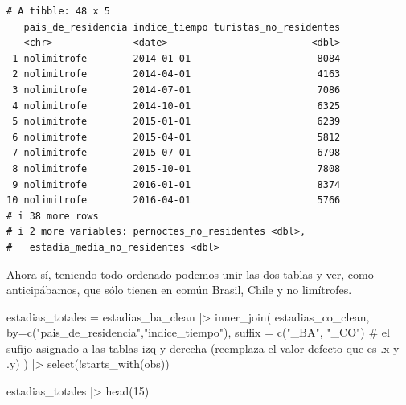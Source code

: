 \documentclass[
  spanish,
  letterpaper,
  DIV=11,
  numbers=noendperiod]{scrartcl}
\newenvironment{Shaded}{\begin{snugshade}}{\end{snugshade}}
\newcommand{\AttributeTok}[1]{\textcolor[rgb]{0.40,0.45,0.13}{#1}}
\newcommand{\CommentTok}[1]{\textcolor[rgb]{0.37,0.37,0.37}{#1}}
\newcommand{\DecValTok}[1]{\textcolor[rgb]{0.68,0.00,0.00}{#1}}
\newcommand{\FunctionTok}[1]{\textcolor[rgb]{0.28,0.35,0.67}{#1}}
\newcommand{\NormalTok}[1]{\textcolor[rgb]{0.00,0.23,0.31}{#1}}
\newcommand{\OtherTok}[1]{\textcolor[rgb]{0.00,0.23,0.31}{#1}}
\newcommand{\SpecialCharTok}[1]{\textcolor[rgb]{0.37,0.37,0.37}{#1}}
\newcommand{\StringTok}[1]{\textcolor[rgb]{0.13,0.47,0.30}{#1}}
\begin{document}
\begin{verbatim}
# A tibble: 48 x 5
   pais_de_residencia indice_tiempo turistas_no_residentes
   <chr>              <date>                         <dbl>
 1 nolimitrofe        2014-01-01                      8084
 2 nolimitrofe        2014-04-01                      4163
 3 nolimitrofe        2014-07-01                      7086
 4 nolimitrofe        2014-10-01                      6325
 5 nolimitrofe        2015-01-01                      6239
 6 nolimitrofe        2015-04-01                      5812
 7 nolimitrofe        2015-07-01                      6798
 8 nolimitrofe        2015-10-01                      7808
 9 nolimitrofe        2016-01-01                      8374
10 nolimitrofe        2016-04-01                      5766
# i 38 more rows
# i 2 more variables: pernoctes_no_residentes <dbl>,
#   estadia_media_no_residentes <dbl>
\end{verbatim}

Ahora sí, teniendo todo ordenado podemos unir las dos tablas y ver, como
anticipábamos, que sólo tienen en común Brasil, Chile y no limítrofes.

\begin{Shaded}
\begin{Highlighting}[]
\NormalTok{estadias\_totales }\OtherTok{=}\NormalTok{ estadias\_ba\_clean }\SpecialCharTok{|\textgreater{}} 
  \FunctionTok{inner\_join}\NormalTok{(}
\NormalTok{    estadias\_co\_clean,}
    \AttributeTok{by=}\FunctionTok{c}\NormalTok{(}\StringTok{"pais\_de\_residencia"}\NormalTok{,}\StringTok{"indice\_tiempo"}\NormalTok{),}
    \AttributeTok{suffix =} \FunctionTok{c}\NormalTok{(}\StringTok{"\_BA"}\NormalTok{, }\StringTok{"\_CO"}\NormalTok{) }\CommentTok{\# el sufijo asignado a las tablas izq y derecha (reemplaza el valor defecto que es .x y .y)}
\NormalTok{  ) }\SpecialCharTok{|\textgreater{}} 
  \FunctionTok{select}\NormalTok{(}\SpecialCharTok{!}\FunctionTok{starts\_with}\NormalTok{(}\StringTok{\textquotesingle{}obs\textquotesingle{}}\NormalTok{))}

\NormalTok{estadias\_totales }\SpecialCharTok{|\textgreater{}} \FunctionTok{head}\NormalTok{(}\DecValTok{15}\NormalTok{)}
\end{Highlighting}
\end{Shaded}
\end{document}

